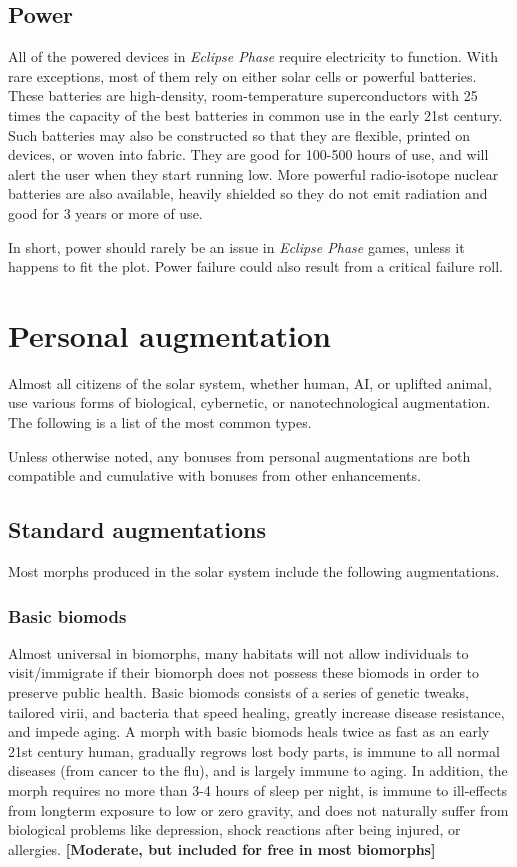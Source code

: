 \subsection{Power}
\label{sec:power}

All of the powered devices in \emph{Eclipse Phase} require electricity to function. With rare exceptions, most of them rely on either solar cells or powerful batteries. These batteries are high-density, room-temperature superconductors with 25 times the capacity of the best batteries in common use in the early 21st century. Such batteries may also be constructed so that they are flexible, printed on devices, or woven into fabric. They are good for 100-500 hours of use, and will alert the user when they start running low. More powerful radio-isotope nuclear batteries are also available, heavily shielded so they do not emit radiation and good for 3 years or more of use.

In short, power should rarely be an issue in \emph{Eclipse Phase} games, unless it happens to fit the plot. Power failure could also result from a critical failure roll.


\section{Personal augmentation}
\label{sec:personal-augmentation}

Almost all citizens of the solar system, whether human, AI, or uplifted animal, use various forms of biological, cybernetic, or nanotechnological augmentation. The following is a list of the most common types.

Unless otherwise noted, any bonuses from personal augmentations are both compatible and cumulative with bonuses from other enhancements.


\subsection{Standard augmentations}
\label{sec:std-augmentations}

Most morphs produced in the solar system include the following augmentations.

\subsubsection{Basic biomods}

Almost universal in biomorphs, many habitats will not allow individuals to visit/immigrate if their biomorph does not possess these biomods in order to preserve public health. Basic biomods consists of a series of genetic tweaks, tailored virii, and bacteria that speed healing, greatly increase disease resistance, and impede aging. A morph with basic biomods heals twice as fast as an early 21st century human, gradually regrows lost body parts, is immune to all normal diseases (from cancer to the flu), and is largely immune to aging. In addition, the morph requires no more than 3-4 hours of sleep per night, is immune to ill-effects from longterm exposure to low or zero gravity, and does not naturally suffer from biological problems like depression, shock reactions after being injured, or allergies. \textbf{[Moderate, but included for free in most biomorphs]}

